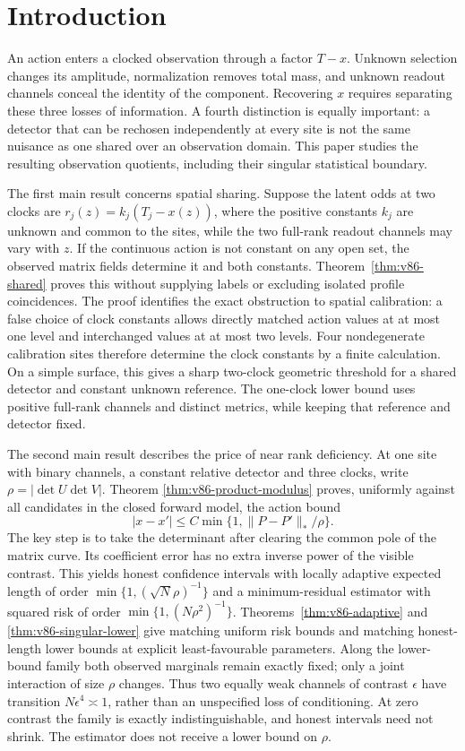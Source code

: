 \section{Introduction}
\label{sec:v86-introduction}
An action enters a clocked observation through a factor $T-x$. Unknown
selection changes its amplitude, normalization removes total mass,
and unknown readout channels conceal the identity of the component.
Recovering $x$ requires separating these three losses of information.
A fourth distinction is equally important: a detector that can be
rechosen independently at every site is not the same nuisance as one
shared over an observation domain. This paper studies the resulting
observation quotients, including their singular statistical boundary.

The first main result concerns spatial sharing. Suppose the latent odds
at two clocks are $r_j(z)=k_j(T_j-x(z))$, where the positive constants
$k_j$ are unknown and common to the sites, while the two full-rank
readout channels may vary with $z$. If the continuous action is not
constant on any open set, the observed matrix fields determine it and
both constants. Theorem~\ref{thm:v86-shared} proves this without
supplying labels or excluding isolated profile coincidences. The
proof identifies the exact obstruction to spatial calibration: a false
choice of clock constants allows directly matched action values at at
most one level and interchanged values at at most two levels. Four
nondegenerate calibration sites therefore determine the clock constants
by a finite calculation. On a simple surface, this gives a sharp
two-clock geometric threshold for a shared detector and constant unknown
reference. The one-clock lower bound uses positive full-rank channels
and distinct metrics, while keeping that reference and detector fixed.

The second main result describes the price of near rank deficiency.
At one site with binary channels, a constant relative detector and
three clocks, write $\rho=|\det U\det V|$. Theorem
\ref{thm:v86-product-modulus} proves, uniformly against all candidates
in the closed forward model, the action bound
\[
       |x-x'|\le C\min\{1,\|P-P'\|_*/\rho\}.
\]
The key step is to take the determinant after clearing the common pole
of the matrix curve. Its coefficient error has no extra inverse power
of the visible contrast. This yields honest confidence intervals with
locally adaptive expected length of order
$\min\{1,(\sqrt N\rho)^{-1}\}$ and a minimum-residual estimator
with squared risk of order $\min\{1,(N\rho^2)^{-1}\}$.
Theorems~\ref{thm:v86-adaptive} and \ref{thm:v86-singular-lower}
give matching uniform risk bounds and matching honest-length lower
bounds at explicit least-favourable parameters. Along the lower-bound
family both observed marginals remain exactly fixed; only a joint
interaction of size $\rho$ changes. Thus two equally weak channels of
contrast $\epsilon$ have transition $N\epsilon^4\asymp1$, rather
than an unspecified loss of conditioning. At zero contrast the family
is exactly indistinguishable, and honest intervals need not shrink.
The estimator does not receive a lower bound on $\rho$.

